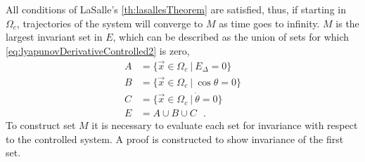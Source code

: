 All conditions of LaSalle's \autoref{th:lasallesTheorem} are satisfied, thus, if starting in $\Omega_c$, trajectories of the system will converge to $M$ as time goes to infinity. $M$ is the largest invariant set in $E$, which can be described as the union of sets for which \autoref{eq:lyapunovDerivativeControlled2} is zero,
\begin{align}
  A &=  \{ \vec{x} \in \Omega_c \ | \ E_\Delta     = 0 \}      \\
  B &=  \{ \vec{x} \in \Omega_c \ | \ \cos \theta  = 0 \}  \\
  C &=  \{ \vec{x} \in \Omega_c \ | \ \dot{\theta} = 0 \}  \\
  E &= A \cup B \cup C \ \ \ . \label{eq:E}
\end{align}
To construct set $M$ it is necessary to evaluate each set for invariance with respect to the controlled system. A proof is constructed to show invariance of the first set.
